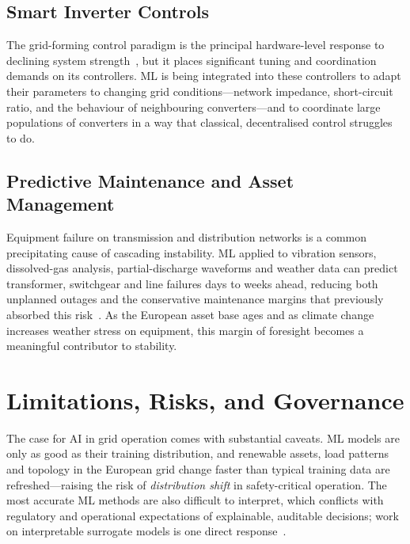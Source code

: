 \documentclass[conference]{IEEEtran}
\begin{document}
\subsection{Smart Inverter Controls}
The grid-forming control paradigm is the principal hardware-level response to declining system strength~\cite{lasseter2020gridforming}, but it places significant tuning and coordination demands on its controllers. ML is being integrated into these controllers to adapt their parameters to changing grid conditions---network impedance, short-circuit ratio, and the behaviour of neighbouring converters---and to coordinate large populations of converters in a way that classical, decentralised control struggles to do.

\subsection{Predictive Maintenance and Asset Management}
Equipment failure on transmission and distribution networks is a common precipitating cause of cascading instability. ML applied to vibration sensors, dissolved-gas analysis, partial-discharge waveforms and weather data can predict transformer, switchgear and line failures days to weeks ahead, reducing both unplanned outages and the conservative maintenance margins that previously absorbed this risk~\cite{ahmad2021ai}. As the European asset base ages and as climate change increases weather stress on equipment, this margin of foresight becomes a meaningful contributor to stability.

\section{Limitations, Risks, and Governance}\label{sec:risks}
The case for AI in grid operation comes with substantial caveats. ML models are only as good as their training distribution, and renewable assets, load patterns and topology in the European grid change faster than typical training data are refreshed---raising the risk of \emph{distribution shift} in safety-critical operation. The most accurate ML methods are also difficult to interpret, which conflicts with regulatory and operational expectations of explainable, auditable decisions; work on interpretable surrogate models is one direct response~\cite{cremer2019interpretable}.
\end{document}
